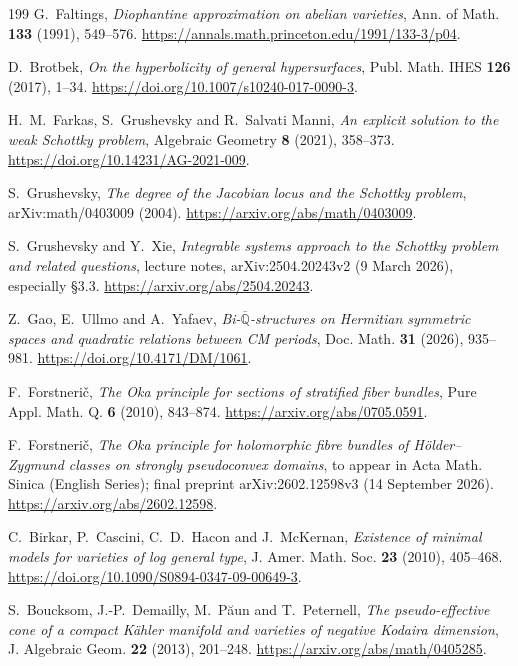 \documentclass[11pt,reqno]{amsart}
\theoremstyle{definition}
\theoremstyle{remark}
\begin{document}
\begin{thebibliography}{199}
 G.~Faltings, \emph{Diophantine approximation on abelian varieties}, Ann. of Math. \textbf{133} (1991), 549--576. \url{https://annals.math.princeton.edu/1991/133-3/p04}.

 D.~Brotbek, \emph{On the hyperbolicity of general hypersurfaces}, Publ. Math. IHES \textbf{126} (2017), 1--34. \url{https://doi.org/10.1007/s10240-017-0090-3}.

 H.~M.~Farkas, S.~Grushevsky and R.~Salvati Manni, \emph{An explicit solution to the weak Schottky problem}, Algebraic Geometry \textbf{8} (2021), 358--373. \url{https://doi.org/10.14231/AG-2021-009}.

 S.~Grushevsky, \emph{The degree of the Jacobian locus and the Schottky problem}, arXiv:math/0403009 (2004). \url{https://arxiv.org/abs/math/0403009}.

 S.~Grushevsky and Y.~Xie, \emph{Integrable systems approach to the Schottky problem and related questions}, lecture notes, arXiv:2504.20243v2 (9 March 2026), especially \S3.3. \url{https://arxiv.org/abs/2504.20243}.

 Z.~Gao, E.~Ullmo and A.~Yafaev, \emph{Bi-$\overline{\mathbb Q}$-structures on Hermitian symmetric spaces and quadratic relations between CM periods}, Doc. Math. \textbf{31} (2026), 935--981. \url{https://doi.org/10.4171/DM/1061}.

 F.~Forstneri\v c, \emph{The Oka principle for sections of stratified fiber bundles}, Pure Appl. Math. Q. \textbf{6} (2010), 843--874. \url{https://arxiv.org/abs/0705.0591}.

 F.~Forstneri\v c, \emph{The Oka principle for holomorphic fibre bundles of H\"older--Zygmund classes on strongly pseudoconvex domains}, to appear in Acta Math. Sinica (English Series); final preprint arXiv:2602.12598v3 (14 September 2026). \url{https://arxiv.org/abs/2602.12598}.

 C.~Birkar, P.~Cascini, C.~D.~Hacon and J.~McKernan, \emph{Existence of minimal models for varieties of log general type}, J. Amer. Math. Soc. \textbf{23} (2010), 405--468. \url{https://doi.org/10.1090/S0894-0347-09-00649-3}.

 S.~Boucksom, J.-P.~Demailly, M.~P\u aun and T.~Peternell, \emph{The pseudo-effective cone of a compact K\"ahler manifold and varieties of negative Kodaira dimension}, J. Algebraic Geom. \textbf{22} (2013), 201--248. \url{https://arxiv.org/abs/math/0405285}.


\end{thebibliography}
\end{document}
